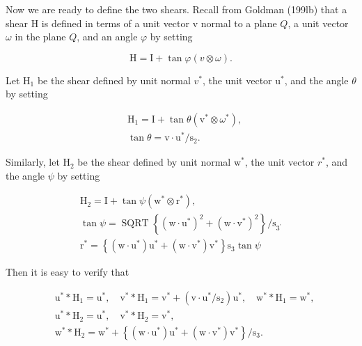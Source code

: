 Now we are ready to define the two shears. Recall from Goldman (199lb) that a shear $\mathrm{H}$ is defined in terms of a unit vector $\mathrm{v}$ normal to a plane $Q$, a unit vector $\omega$ in the plane $Q$, and an angle $\varphi$ by setting

$$
\mathrm{H}=\mathrm{I}+\tan \varphi(v \otimes \omega) .
$$

Let $\mathrm{H}_{1}$ be the shear defined by unit normal $v^{*}$, the unit vector $\mathrm{u}^{*}$, and the angle $\theta$ by setting

$$
\begin{aligned}
&\mathrm{H}_{1}=\mathrm{I}+\tan \theta\left(\mathrm{v}^{*} \otimes \omega^{*}\right), \\
&\tan \theta=\mathrm{v} \cdot \mathrm{u}^{*} / \mathrm{s}_{2} .
\end{aligned}
$$

Similarly, let $\mathrm{H}_{2}$ be the shear defined by unit normal $\mathrm{w}^{*}$, the unit vector $r^{*}$, and the angle $\psi$ by setting

$$
\begin{gathered}
\mathrm{H}_{2}=\mathrm{I}+\tan \psi\left(\mathrm{w}^{*} \otimes \mathrm{r}^{*}\right), \\
\tan \psi=\operatorname{SQRT}\left\{\left(\mathrm{w} \cdot \mathrm{u}^{*}\right)^{2}+\left(\mathrm{w} \cdot \mathrm{v}^{*}\right)^{2}\right\} / \mathrm{s}_{3^{\prime}} \\
\mathrm{r}^{*}=\left\{\left(\mathrm{w} \cdot \mathrm{u}^{*}\right) \mathrm{u}^{*}+\left(\mathrm{w} \cdot \mathrm{v}^{*}\right) \mathrm{v}^{*}\right\} \mathrm{s}_{3} \tan \psi
\end{gathered}
$$

Then it is easy to verify that

$$
\begin{aligned}
&\mathrm{u}^{*} * \mathrm{H}_{1}=\mathrm{u}^{*}, \quad \mathrm{v}^{*} * \mathrm{H}_{1}=\mathrm{v}^{*}+\left(\mathrm{v} \cdot \mathrm{u}^{*} / \mathrm{s}_{2}\right) \mathrm{u}^{*}, \quad \mathrm{w}^{*} * \mathrm{H}_{1}=\mathrm{w}^{*}, \\
&\mathrm{u}^{*} * \mathrm{H}_{2}=\mathrm{u}^{*}, \quad \mathrm{v}^{*} * \mathrm{H}_{2}=\mathrm{v}^{*}, \\
&\mathrm{w}^{*} * \mathrm{H}_{2}=\mathrm{w}^{*}+\left\{\left(\mathrm{w} \cdot \mathrm{u}^{*}\right) \mathrm{u}^{*}+\left(\mathrm{w} \cdot \mathrm{v}^{*}\right) \mathrm{v}^{*}\right\} / \mathrm{s}_{3} .
\end{aligned}
$$

